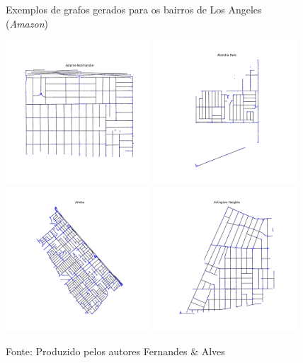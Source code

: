 \begin{figure}[H]
    \centering
    \caption{Exemplos de grafos gerados para os bairros de Los Angeles (\textit{Amazon})} \label{fig:graphsLosAngeles}
    \includegraphics[width=0.48\textwidth]{images/6_amazon/grafos/graph_Adams-Normandie.pdf}
    \includegraphics[width=0.48\textwidth]{images/6_amazon/grafos/graph_Alondra Park.pdf}
    \includegraphics[width=0.48\textwidth]{images/6_amazon/grafos/graph_Arleta.pdf}
    \includegraphics[width=0.48\textwidth]{images/6_amazon/grafos/graph_Arlington Heights.pdf}
    \caption*{Fonte: Produzido pelos autores Fernandes \& Alves}
\end{figure}


